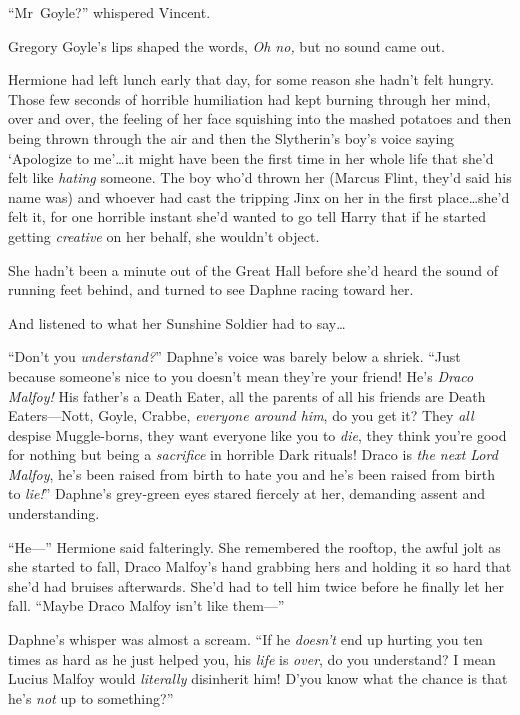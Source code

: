 “Mr~Goyle?” whispered Vincent.

Gregory Goyle’s lips shaped the words, \emph{Oh no,} but no sound came out.

\later

Hermione had left lunch early that day, for some reason she hadn’t felt hungry. Those few seconds of horrible humiliation had kept burning through her mind, over and over, the feeling of her face squishing into the mashed potatoes and then being thrown through the air and then the Slytherin’s boy’s voice saying ‘Apologize to me’…it might have been the first time in her whole life that she’d felt like \emph{hating} someone. The boy who’d thrown her (Marcus Flint, they’d said his name was) and whoever had cast the tripping Jinx on her in the first place…she’d felt it, for one horrible instant she’d wanted to go tell Harry that if he started getting \emph{creative} on her behalf, she wouldn’t object.

She hadn’t been a minute out of the Great Hall before she’d heard the sound of running feet behind, and turned to see Daphne racing toward her.

And listened to what her Sunshine Soldier had to say…

“Don’t you \emph{understand?}” Daphne’s voice was barely below a shriek. “Just because someone’s nice to you doesn’t mean they’re your friend! He’s \emph{Draco Malfoy!} His father’s a Death Eater, all the parents of all his friends are Death Eaters—Nott, Goyle, Crabbe, \emph{everyone around him}, do you get it? They \emph{all} despise Muggle-borns, they want everyone like you to \emph{die}, they think you’re good for nothing but being a \emph{sacrifice} in horrible Dark rituals! Draco is \emph{the next Lord Malfoy}, he’s been raised from birth to hate you and he’s been raised from birth to \emph{lie!}” Daphne’s grey-green eyes stared fiercely at her, demanding assent and understanding.

“He—” Hermione said falteringly. She remembered the rooftop, the awful jolt as she started to fall, Draco Malfoy’s hand grabbing hers and holding it so hard that she’d had bruises afterwards. She’d had to tell him twice before he finally let her fall. “Maybe Draco Malfoy isn’t like them—”

Daphne’s whisper was almost a scream. “If he \emph{doesn’t} end up hurting you ten times as hard as he just helped you, his \emph{life} is \emph{over}, do you understand? I mean Lucius Malfoy would \emph{literally} disinherit him! D’you know what the chance is that he’s \emph{not} up to something?”

